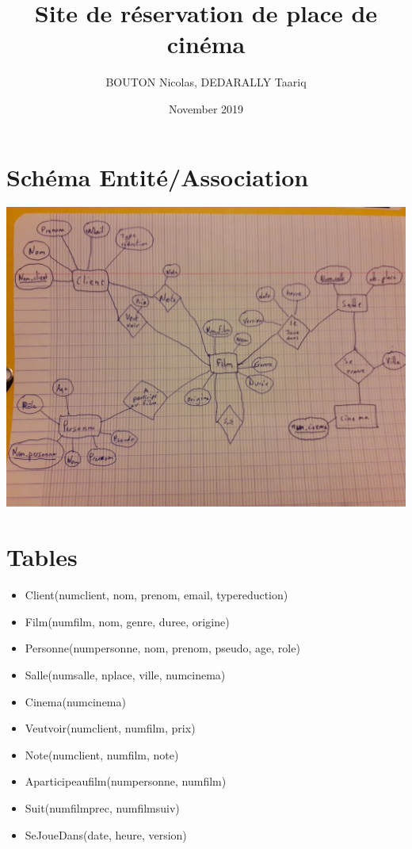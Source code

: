 \documentclass{article}
\title{Site de réservation de place de cinéma}
\author{BOUTON Nicolas, DEDARALLY Taariq}
\date{November 2019}
\begin{document}
\maketitle

\section{Schéma Entité/Association}

\begin{center}
    \includegraphics[scale=0.1]{20191101_213721.jpg}
\end{center}{}

\newpage

\section{Tables}
\newline
\begin{itemize}
    \item Client(num\textunderscore client, nom, prenom, email, type\textunderscore reduction) 
    \item Film(num\textunderscore film, nom, genre, duree, origine)  
    \item Personne(num\textunderscore personne, nom, prenom, pseudo, age, role) 
    \item Salle(num\textunderscore salle, n\textunderscore place, ville, num\textunderscore cinema)
    \item Cinema(num\textunderscore cinema) 
    \item Veut\textunderscore voir(num\textunderscore client, num\textunderscore film, prix)
    \item Note(num\textunderscore client, num\textunderscore film, note)
    \item A\textunderscore participe\textunderscore au\textunderscore film(num\textunderscore personne, num\textunderscore film)
    \item Suit(num\textunderscore film\textunderscore prec, num\textunderscore film\textunderscore suiv)
    \item SeJoueDans(date, heure, version)
\end{itemize}
\end{document}

